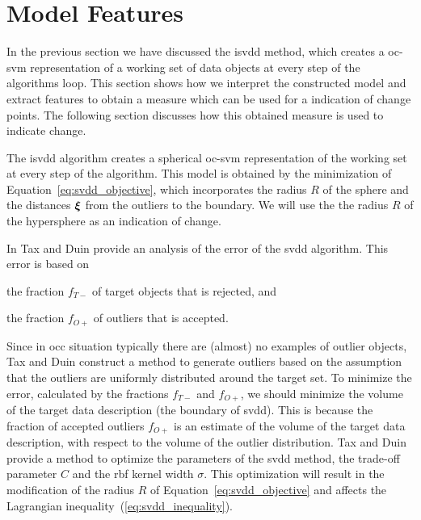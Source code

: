 \section{Model Features}\label{sec:method_model_features}
In the previous section we have discussed the \gls{isvdd} method, which creates a \gls{oc-svm} representation of a working set of data objects at every step of the algorithms loop.
This section shows how we interpret the constructed model and extract features to obtain a measure which can be used for a indication of change points.
The following section discusses how this obtained measure is used to indicate change.

The \gls{isvdd} algorithm creates a spherical \gls{oc-svm} representation of the working set at every step of the algorithm.
This model is obtained by the minimization of Equation~\ref{eq:svdd_objective}, which incorporates the radius $R$ of the sphere and the distances $\vectorsym{\xi}$ from the outliers to the boundary.
We will use the the radius $R$ of the hypersphere as an indication of change.

In \cite{tax2002uniform} Tax and Duin provide an analysis of the error of the \gls{svdd} algorithm.
This error is based on
\begin{inparaenum}[\itshape 1\upshape)]
\item the fraction $f_{T-}$ of target objects that is rejected, and
\item the fraction $f_{O+}$ of outliers that is accepted.
\end{inparaenum}
Since in \gls{occ} situation typically there are (almost) no examples of outlier objects, Tax and Duin construct a method to generate outliers based on the assumption that the outliers are uniformly distributed around the target set.
To minimize the error, calculated by the fractions $f_{T-}$ and $f_{O+}$, we should minimize the volume of the target data description (\ie the boundary of \gls{svdd}).
This is because the fraction of accepted outliers $f_{O+}$ is an estimate of the volume of the target data description, with respect to the volume of the outlier distribution.
Tax and Duin provide a method to optimize the parameters of the \gls{svdd} method, \ie the trade-off parameter $C$ and the \gls{rbf} kernel width $\sigma$.
This optimization will result in the modification of the radius $R$ of Equation~\ref{eq:svdd_objective} and affects the Lagrangian inequality~(\ref{eq:svdd_inequality}).

